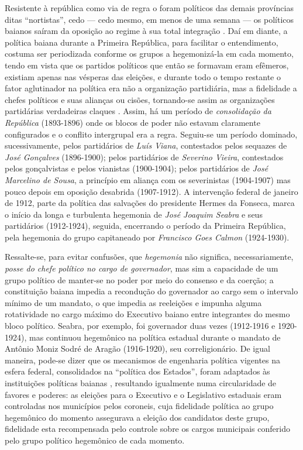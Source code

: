 Resistente à república como via de regra o foram políticos das demais províncias ditas ``nortistas'', cedo --- cedo mesmo, em menos de uma semana --- os políticos baianos saíram da oposição ao regime à sua total integração \cite{sampaio_legislativo_1985}. Daí em diante, a política baiana durante a Primeira República, para facilitar o entendimento, costuma ser periodizada conforme os grupos a hegemonizá-la em cada momento, tendo em vista que os partidos políticos que então se formavam eram efêmeros, existiam apenas nas vésperas das eleições, e durante todo o tempo restante o fator aglutinador na política era não a organização partidiária, mas a fidelidade a chefes políticos e suas alianças ou cisões, tornando-se assim as organizações partidárias verdadeiras claques \cite[p.~18]{sampaio_partidos_1978}. Assim, há um período de \textit{consolidação da República} (1893-1896) onde os blocos de poder não estavam claramente configurados e o conflito intergrupal era a regra. Seguiu-se um período dominado, sucessivamente, pelos partidários de \textit{Luís Viana}, contestados pelos sequazes de \textit{José Gonçalves} (1896-1900); pelos partidários de \textit{Severino Vieira}, contestados pelos gonçalvistas e pelos vianistas (1900-1904); pelos partidários de \textit{José Marcelino de Sousa}, a princípio em aliança com os severinistas (1904-1907) mas pouco depois em oposição desabrida (1907-1912). A intervenção federal de janeiro de 1912, parte da política das salvações do presidente Hermes da Fonseca, marca o início da longa e turbulenta hegemonia de \textit{José Joaquim Seabra} e seus partidários (1912-1924), seguida, encerrando o período da Primeira República, pela hegemonia do grupo capitaneado por \textit{Francisco Goes Calmon} (1924-1930). 

Ressalte-se, para evitar confusões, que \textit{hegemonia} não significa, necessariamente, \textit{posse do chefe político no cargo de governador}, mas sim a capacidade de um grupo político de manter-se no poder por meio do consenso e da coerção; a constituição baiana impedia a recondução do governador ao cargo sem o intervalo mínimo de um mandato, o que impedia as reeleições e impunha alguma rotatividade no cargo máximo do Executivo baiano entre integrantes do mesmo bloco político. Seabra, por exemplo, foi governador duas vezes (1912-1916 e 1920-1924), mas continuou hegemônico na política estadual durante o mandato de Antônio Moniz Sodré de Aragão (1916-1920), seu correligionário. De igual maneira, pode-se dizer que os mecanismos de engenharia política vigentes na esfera federal, consolidados na ``política dos Estados'', foram adaptados às instituições políticas baianas \cite{sampaio_legislativo_1985}, resultando igualmente numa circularidade de favores e poderes: as eleições para o Executivo e o Legislativo estaduais eram controladas nos municípios pelos coroneis, cuja fidelidade política ao grupo hegemônico do momento assegurava a eleição dos candidatos deste grupo, fidelidade esta recompensada pelo controle sobre os cargos municipais conferido pelo grupo político hegemônico de cada momento.

